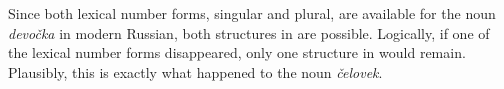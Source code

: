\documentclass[output=paper,
modfonts,
newtxmath,
hidelinks
]{langscibook}
\begin{document}
{\noindent Since both lexical number forms, singular and plural, are available for the noun \textit{devočka} in modern Russian, both structures in  are possible. Logically, if one of the lexical number forms disappeared, only one structure in  would remain. Plausibly, this is exactly what happened to the noun \textit{čelovek}.}

\ea \label{ex6}
	\z 
\z


\ea \label{ex7}
	\z
\z
\end{document}
